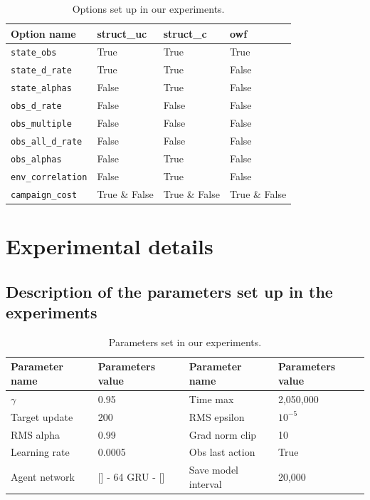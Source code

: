 \begin{table}
\centering
\caption{Options set up in our experiments.}
\label{tab:ouroptionvlaues}
\begin{tabular}{llll}
\toprule
Option name & struct\_uc & struct\_c & owf \\
\midrule
\texttt{state\_obs} & True & True & True \\
\texttt{state\_d\_rate} & True & True & False \\
\texttt{state\_alphas} & False & True & False \\
\texttt{obs\_d\_rate} & False & False & False \\
\texttt{obs\_multiple} & False & False & False \\
\texttt{obs\_all\_d\_rate} & False & False & False \\
\texttt{obs\_alphas} & False & True & False \\
\texttt{env\_correlation} & False & True & False \\
\texttt{campaign\_cost} & True \& False & True \& False & True \& False \\
\bottomrule
\end{tabular}
\end{table}


\section{Experimental details}
\label{sec:ch5_appendix_exp_details}
\subsection{Description of the parameters set up in the experiments}

\begin{table}
  \caption{Parameters set in our experiments.}
  \label{tab:exp_details_common}
  \centering
  \begin{tabular}{llll}
    \toprule
    Parameter name & Parameters value & Parameter name & Parameters value \\
    \midrule
    $\gamma$ & 0.95 & Time max & 2,050,000 \\
    Target update & 200  & RMS epsilon &  $10^{-5}$ \\
    RMS alpha &  0.99  & Grad norm clip & 10 \\
    Learning rate & 0.0005 &Obs last action & True \\
    Agent network & [] - 64 GRU - [] &Save model interval & 20,000 \\
    \bottomrule
  \end{tabular}
\end{table}


